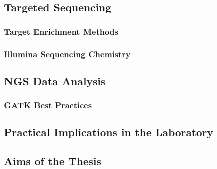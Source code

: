   \subsection{Targeted Sequencing}

    \subsubsection{Target Enrichment Methods}

    \subsubsection{Illumina Sequencing Chemistry}

  \subsection{NGS Data Analysis}

    \subsubsection{GATK Best Practices}

  \subsection{Practical Implications in the Laboratory}

  \subsection{Aims of the Thesis}
